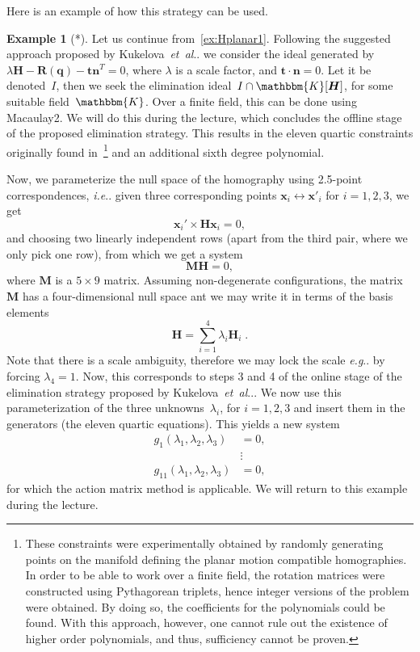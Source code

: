 \documentclass[11pt,a4paper]{article}
\makeatletter
\theoremstyle{definition}
\newtheorem{example}{Example}
\newcommand{\mat}[1]{\bm{#1}}
\newcommand{\K}{\ensuremath{\mathbbm{K}}}
\DeclareRobustCommand\eg{\emph{e.g}\@ifnextchar.{}{.\@}}
\DeclareRobustCommand\etal{\emph{et~al}\@ifnextchar.{}{.\@}}
\DeclareRobustCommand\ie{\emph{i.e}\@ifnextchar.{}{.\@}}
\makeatother
\begin{document}
Here is an example of how this strategy can be used.
\begin{example}[*]
Let us continue from~\cref{ex:Hplanar1}.
Following the suggested approach proposed by Kukelova~\etal{} we
consider the ideal generated by
\mbox{$\lambda \mat{H}-\mat{R}(\mat{q})-\mat{tn}^{T}=0$}, where $\lambda$ is a scale factor,
and $\mat{t}\cdot\mat{n}=0$. Let it be denoted~$I$,
then we seek the elimination ideal~$I\cap\K[\mat{H}]$, for some suitable field~$\K$.
Over a finite field, this can be done using Macaulay2. We will do this during the lecture, which
concludes the offline stage of the proposed elimination strategy.
This results in the eleven quartic constraints originally found
in~\cite{wadenback2016}\footnote{
These constraints were experimentally obtained by randomly generating points on the manifold defining
the planar motion compatible homographies.
In order to be able to work over a finite field, the rotation matrices were constructed
using Pythagorean triplets, hence integer versions of the problem were obtained. By doing so,
the coefficients for the polynomials could be found.
With this approach, however, one cannot rule out the existence of higher order polynomials,
and thus, sufficiency cannot be proven.} and an additional sixth degree polynomial.

Now, we parameterize the null space of the homography using 2.5-point correspondences, \ie{}
given three corresponding points $\mat{x}_i \leftrightarrow \mat{x}'_i$ for $i=1,2,3$, we get
\begin{equation}
    \mat{x}_i'\times \mat{Hx}_i = 0,
\end{equation}
and choosing two linearly independent rows (apart from the third pair, where we only pick one row),
from which we get a system
\begin{equation}
\mat{M}\mat{H} = 0,
\end{equation}
where $\mat{M}$ is a $5\times 9$ matrix. Assuming non-degenerate configurations, the matrix $\mat{M}$
has a four-dimensional null space ant we may write it in terms of the basis elements
\begin{equation}
    \mat{H} = \sum_{i=1}^4\lambda_i\mat{H}_i\;.
\end{equation}
Note that there is a scale ambiguity, therefore we may lock the scale \eg{} by forcing \mbox{$\lambda_4=1$}.
Now, this corresponds to steps 3 and 4 of the online stage of the elimination strategy proposed by
Kukelova~\etal{}. We now use this parameterization of the three unknowns~$\lambda_i$, for $i=1,2,3$
and insert them in the generators (the eleven quartic equations). This yields a new system
\begin{equation}
\begin{aligned}
    g_1(\lambda_1,\lambda_2,\lambda_3) &= 0, \\
    &\vdots \\
    g_{11}(\lambda_1,\lambda_2,\lambda_3) &= 0,
\end{aligned}
\end{equation}
for which the action matrix method is applicable. We will return to this example during the lecture.
\end{example}
\end{document}
